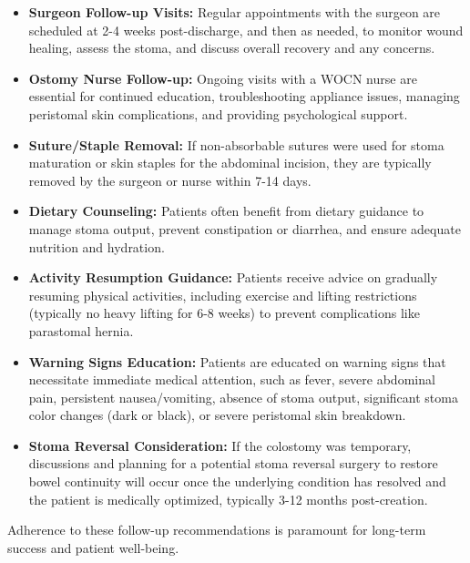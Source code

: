 \begin{itemize}
  \item \textbf{Surgeon Follow-up Visits:} Regular appointments with the surgeon are scheduled at 2-4 weeks post-discharge, and then as needed, to monitor wound healing, assess the stoma, and discuss overall recovery and any concerns.
  
  \item \textbf{Ostomy Nurse Follow-up:} Ongoing visits with a WOCN nurse are essential for continued education, troubleshooting appliance issues, managing peristomal skin complications, and providing psychological support.
  
  \item \textbf{Suture/Staple Removal:} If non-absorbable sutures were used for stoma maturation or skin staples for the abdominal incision, they are typically removed by the surgeon or nurse within 7-14 days.
  
  \item \textbf{Dietary Counseling:} Patients often benefit from dietary guidance to manage stoma output, prevent constipation or diarrhea, and ensure adequate nutrition and hydration.
  
  \item \textbf{Activity Resumption Guidance:} Patients receive advice on gradually resuming physical activities, including exercise and lifting restrictions (typically no heavy lifting for 6-8 weeks) to prevent complications like parastomal hernia.
  
  \item \textbf{Warning Signs Education:} Patients are educated on warning signs that necessitate immediate medical attention, such as fever, severe abdominal pain, persistent nausea/vomiting, absence of stoma output, significant stoma color changes (dark or black), or severe peristomal skin breakdown.
  
  \item \textbf{Stoma Reversal Consideration:} If the colostomy was temporary, discussions and planning for a potential stoma reversal surgery to restore bowel continuity will occur once the underlying condition has resolved and the patient is medically optimized, typically 3-12 months post-creation.
\end{itemize}

Adherence to these follow-up recommendations is paramount for long-term success and patient well-being.

